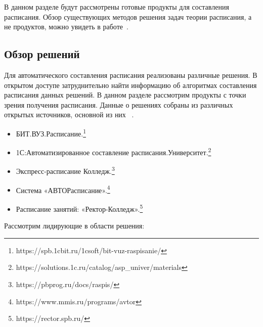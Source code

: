 
\label{sec:relatedworks}



В данном разделе будут рассмотрены готовые продукты для составления расписания.
Обзор существующих методов решения задач теории расписания, а не продуктов, можно увидеть в работе~\cite{Прорасписание}.
  \subsection{Обзор решений}
Для автоматического составления расписания реализованы различные решения. В открытом доступе затруднительно найти информацию об алгоритмах составления расписания данных решений. В данном разделе рассмотрим продукты с точки зрения получения расписания. Данные о решениях собраны из различных открытых источников, основной из них ~\cite{Обзоррешение}.
  \begin{itemize}
    \item БИТ.ВУЗ.Расписание.\footnote{https://spb.1cbit.ru/1csoft/bit-vuz-raspisanie/}
    \item 1С:Автоматизированное составление расписания.Университет.\footnote{https://solutions.1c.ru/catalog/asp\_univer/materials}
    \item Экспресс-расписание Колледж.\footnote{https://pbprog.ru/docs/raspis/}
    \item Система «АВТОРасписание».\footnote{https://www.mmis.ru/programs/avtor}
    \item Расписание занятий: «Ректор-Колледж».\footnote{https://rector.spb.ru/}
  \end{itemize}
  Рассмотрим лидирующие в области решения:


